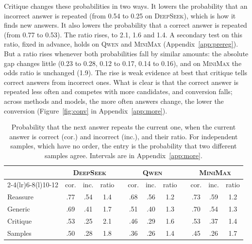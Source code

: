 \documentclass[11pt]{article}
\newcommand{\ds}{\textsc{DeepSeek}}
\newcommand{\qw}{\textsc{Qwen}}
\newcommand{\mm}{\textsc{MiniMax}}
\begin{document}
Critique changes these probabilities in two ways.
It lowers the probability that an incorrect answer is repeated (from 0.54 to 0.25 on \ds), which is how it finds new answers.
It also lowers the probability that a correct answer is repeated (from 0.77 to 0.53).
The ratio rises, to 2.1, 1.6 and 1.4.
A secondary test on this ratio, fixed in advance, holds on \qw{} and \mm{} (Appendix~\ref{app:prereg}).
But a ratio rises whenever both probabilities fall by similar amounts: the absolute gap changes little (0.23 to 0.28, 0.12 to 0.17, 0.14 to 0.16), and on \mm{} the odds ratio is unchanged (1.9).
The rise is weak evidence at best that critique tells correct answers from incorrect ones.
What is clear is that the correct answer is repeated less often and competes with more candidates, and conversion falls; across methods and models, the more often answers change, the lower the conversion (Figure~\ref{fig:conv} in Appendix~\ref{app:more}).

\begin{table}[t]
\centering
\small
\setlength{\tabcolsep}{2.1pt}
\begin{tabular}{@{}l ccc c ccc c ccc@{}}
\toprule
 & \multicolumn{3}{c}{\ds} & & \multicolumn{3}{c}{\qw} & & \multicolumn{3}{c}{\mm} \\
\cmidrule(lr){2-4}\cmidrule(lr){6-8}\cmidrule(l){10-12}
 & cor. & inc. & ratio & & cor. & inc. & ratio & & cor. & inc. & ratio \\
\midrule
Reassure & .77 & .54 & 1.4 & & .68 & .56 & 1.2 & & .73 & .59 & 1.2 \\
Generic & .69 & .41 & 1.7 & & .51 & .40 & 1.3 & & .70 & .54 & 1.3 \\
Critique & .53 & .25 & 2.1 & & .46 & .29 & 1.6 & & .53 & .37 & 1.4 \\
Samples & .50 & .28 & 1.8 & & .36 & .26 & 1.4 & & .45 & .26 & 1.7 \\
\bottomrule
\end{tabular}
\caption{Probability that the next answer repeats the current one, when the current answer is correct (cor.) and incorrect (inc.), and their ratio. For independent samples, which have no order, the entry is the probability that two different samples agree. Intervals are in Appendix~\ref{app:more}.}
\label{tab:stay}
\end{table}
\end{document}
